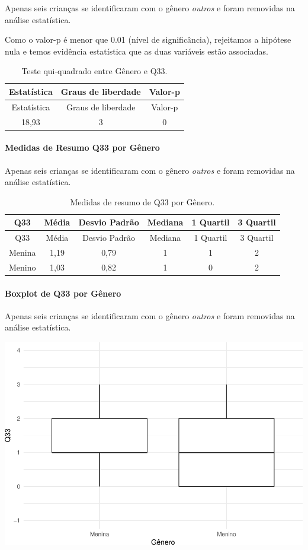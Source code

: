 \documentclass[]{article}
\let\oldparagraph\paragraph
\renewcommand{\paragraph}[1]{\oldparagraph{#1}\mbox{}}
\begin{document}
Apenas seis crianças se identificaram com o gênero \emph{outros} e foram removidas na análise estatística.

Como o valor-p é menor que 0.01 (nível de significância), rejeitamos a hipótese nula e temos evidência estatística que as duas variáveis estão associadas.

\begin{longtable}[]{@{}ccc@{}}
\caption{\label{tab:unnamed-chunk-1146}Teste qui-quadrado entre Gênero e Q33.}\tabularnewline
\toprule
Estatística & Graus de liberdade & Valor-p\tabularnewline
\midrule
\endfirsthead
\toprule
Estatística & Graus de liberdade & Valor-p\tabularnewline
\midrule
\endhead
18,93 & 3 & 0\tabularnewline
\bottomrule
\end{longtable}

\cleardoublepage

\hypertarget{medidas-de-resumo-q33-por-guxeanero}{%
\paragraph{Medidas de Resumo Q33 por Gênero}\label{medidas-de-resumo-q33-por-guxeanero}}

Apenas seis crianças se identificaram com o gênero \emph{outros} e foram removidas na análise estatística.

\begin{longtable}[]{@{}cccccc@{}}
\caption{\label{tab:unnamed-chunk-1147}Medidas de resumo de Q33 por Gênero.}\tabularnewline
\toprule
Q33 & Média & Desvio Padrão & Mediana & 1 Quartil & 3 Quartil\tabularnewline
\midrule
\endfirsthead
\toprule
Q33 & Média & Desvio Padrão & Mediana & 1 Quartil & 3 Quartil\tabularnewline
\midrule
\endhead
Menina & 1,19 & 0,79 & 1 & 1 & 2\tabularnewline
Menino & 1,03 & 0,82 & 1 & 0 & 2\tabularnewline
\bottomrule
\end{longtable}

\hypertarget{boxplot-de-q33-por-guxeanero}{%
\paragraph{Boxplot de Q33 por Gênero}\label{boxplot-de-q33-por-guxeanero}}

Apenas seis crianças se identificaram com o gênero \emph{outros} e foram removidas na análise estatística.

\begin{center}\includegraphics[width=0.75\linewidth]{relatorio_covid19_files/figure-latex/unnamed-chunk-1148-1} \end{center}
\end{document}
